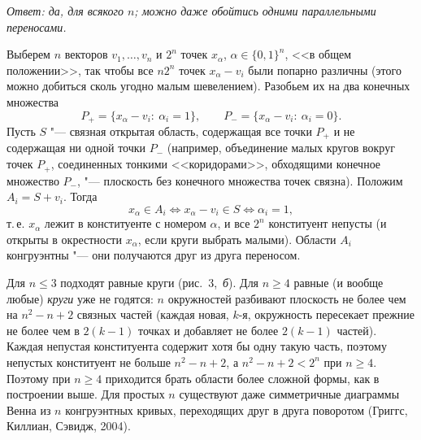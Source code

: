 \begin{solution}[3 (\S\,2)]
\emph{Ответ: да, для всякого $n$; можно даже обойтись одними
параллельными переносами.}

Выберем $n$ векторов $v_1,\dots,v_n$ и $2^n$ точек $x_\alpha$,
$\alpha\in\{0,1\}^n$, <<в общем положении>>, так чтобы все $n2^n$ точек
$x_\alpha-v_i$ были попарно различны (этого можно добиться сколь угодно
малым шевелением). Разобьем их на два конечных множества
\[
P_+=\{x_\alpha-v_i:\ \alpha_i=1\},\qquad P_-=\{x_\alpha-v_i:\ \alpha_i=0\}.
\]
Пусть $S$ "--- связная открытая область, содержащая все точки $P_+$ и не
содержащая ни одной точки $P_-$ (например, объединение малых кругов вокруг
точек $P_+$, соединенных тонкими <<коридорами>>, обходящими конечное
множество $P_-$, "--- плоскость без конечного множества точек связна).
Положим $A_i=S+v_i$. Тогда
\[
x_\alpha\in A_i\iff x_\alpha-v_i\in S\iff\alpha_i=1,
\]
т.\,е. $x_\alpha$ лежит в конституенте с номером $\alpha$, и все $2^n$
конституент непусты (и открыты в окрестности $x_\alpha$, если круги
выбрать малыми). Области $A_i$ конгруэнтны "--- они получаются друг из
друга переносом.

Для $n\le3$ подходят равные круги (рис.~3,~\emph{б}). Для $n\ge4$
равные (и вообще любые) \emph{круги} уже не годятся: $n$ окружностей
разбивают плоскость не более чем на $n^2-n+2$ связных частей (каждая новая,
$k$-я, окружность пересекает прежние не более чем в $2(k-1)$ точках
и добавляет не более $2(k-1)$ частей). Каждая непустая конституента
содержит хотя бы одну такую часть, поэтому непустых конституент не больше
$n^2-n+2$, а $n^2-n+2<2^n$ при $n\ge4$. Поэтому при $n\ge4$ приходится
брать области более сложной формы, как в построении выше. Для простых $n$
существуют даже симметричные диаграммы Венна из $n$ конгруэнтных кривых,
переходящих друг в друга поворотом (Григгс, Киллиан, Сэвидж, 2004).
\end{solution}
